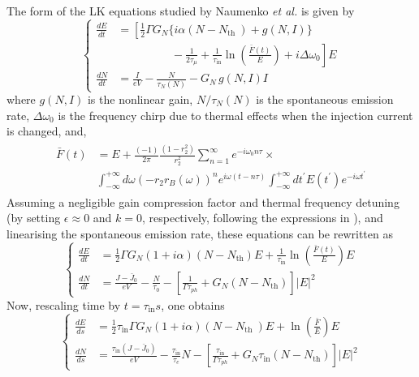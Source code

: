 The form of the LK equations studied by Naumenko \textit{et al.} \cite{naumenko2003characteristics,naumenko2004slow} is given by
\begin{equation}
\left\{
\begin{aligned}
\frac{d E}{d t} &= \left[\frac{1}{2} \Gamma G_N \big\{ i \alpha\left(N-N_{\text {th }}\right)+g(N, I) \big\} \right. \\
                &\left.\hspace{2cm} - \frac{1}{2 \tau_\mu}+\frac{1}{\tau_\text{in}} \ln \left(\frac{\bar{F}(t)}{E}\right)+i \Delta \omega_0\right] E\\
\frac{d N}{d t} &= \frac{I}{e V}-\frac{N}{\tau_N(N)}-G_N \, g(N, I) I
\end{aligned}
\right.
\end{equation}
%
where $g(N, I)$ is the nonlinear gain, $N / \tau_N(N)$ is the spontaneous emission rate, $\Delta \omega_0$ is the frequency chirp due to thermal effects when the injection current is changed, and,
%
\begin{gather}
\begin{aligned}
\bar{F}(t) &=  E+\frac{(-1)}{2 \pi} \frac{\left(1-r_2^2\right)}{r_2^2} \sum_{n=1}^{\infty} e^{-i \omega_0 n \tau} \times \\
            &\int_{-\infty}^{+\infty} d \omega\left(-r_2 r_B(\omega)\right)^n e^{i \omega(t-n \tau)} \int_{-\infty}^{+\infty} d t^{\prime} E\left(t^{\prime}\right) e^{-i \omega t^{\prime}}
\end{aligned}
\end{gather}
%
Assuming a negligible gain compression factor and thermal frequency detuning (by setting $\epsilon \approx 0$ and $k=0$, respectively, following the expressions in \cite{naumenko2003characteristics}), and linearising the spontaneous emission rate, these equations can be rewritten as
%
\begin{equation*}
\left\{\begin{aligned}
\frac{d E}{d t} &= \frac{1}{2} \Gamma G_N(1+i \alpha)\left(N-N_\text{th}\right) E + \frac{1}{\tau_\text{in}} \ln \left(\frac{\bar{F}(t)}{E}\right) E 
\\
\frac{d N}{d t} &= \frac{J-\bar{J}_0}{e V}-\frac{N}{\tau_0}-\left[\frac{1}{\Gamma \tau_{p h}} + G_N\left(N-N_\text{th}\right)\right]|E|^2
\end{aligned}\right.
\end{equation*}
%
Now, rescaling time by $t=\tau_\text{in} s$, one obtains
%
\begin{equation*}
\left\{\begin{aligned}
\frac{d E}{d s} &= \frac{1}{2} \tau_\text{in} \Gamma G_N(1+i \alpha)\left(N-N_{\text {th }}\right) E + \ln \left(\frac{\bar{F}}{E}\right) E
\\
\frac{d N}{d s} &= \frac{\tau_{\text{in}}\left(J-\bar{J}_0\right)}{e V}-\frac{\tau_\text{in}}{\tau_e} N-\left[\frac{\tau_\text{in}}{\Gamma \tau_{ph}}+G_N \tau_\text{in}\left(N-N_{\text{th}}\right)\right]|E|^2
\end{aligned}\right.
\end{equation*}

